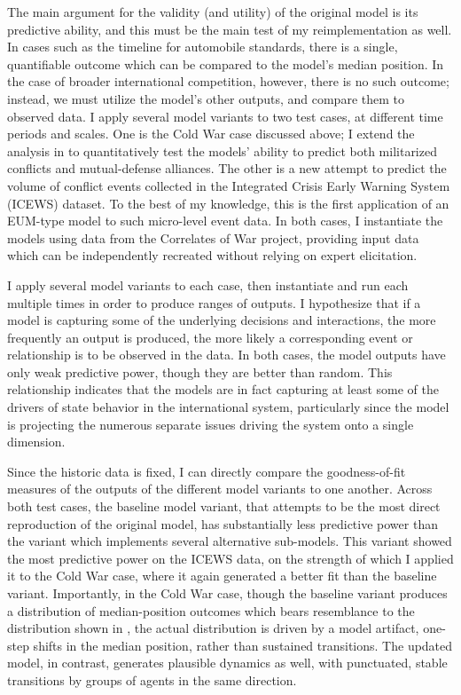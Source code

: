 The main argument for the validity (and utility) of the original model is its predictive ability, and this must be the main test of my reimplementation as well. In cases such as the timeline for automobile standards, there is a single, quantifiable outcome which can be compared to the model's median position. In the case of broader international competition, however, there is no such outcome; instead, we must utilize the model's other outputs, and compare them to observed data. I apply several model variants to two test cases, at different time periods and scales. One is the Cold War case discussed above; I extend the analysis in \citet{bdm_1998} to quantitatively test the models' ability to predict both militarized conflicts and mutual-defense alliances. The other is a new attempt to predict the volume of conflict events collected in the Integrated Crisis Early Warning System (ICEWS) dataset. To the best of my knowledge, this is the first application of an EUM-type model to such micro-level event data. In both cases, I instantiate the models using data from the Correlates of War project, providing input data which can be independently recreated without relying on expert elicitation.

I apply several model variants to each case, then instantiate and run each multiple times in order to produce ranges of outputs. I hypothesize that if a model is capturing some of the underlying decisions and interactions, the more frequently an output is produced, the more likely a corresponding event or relationship is to be observed in the data.  In both cases, the model outputs have only weak predictive power, though they are better than random. This relationship indicates that the models are in fact capturing at least some of the drivers of state behavior in the international system, particularly since the model is projecting the numerous separate issues driving the system onto a single dimension.

Since the historic data is fixed, I can directly compare the goodness-of-fit measures of the outputs of the different model variants to one another. Across both test cases, the baseline model variant, that attempts to be the most direct reproduction of the original model, has substantially less predictive power than the variant which implements several alternative sub-models. This variant showed the most predictive power on the ICEWS data, on the strength of which I applied it to the Cold War case, where it again generated a better fit than the baseline variant. Importantly, in the Cold War case, though the baseline variant produces a distribution of median-position outcomes which bears resemblance to the distribution shown in \citet{bdm_1998}, the actual distribution is driven by a model artifact, one-step shifts in the median position, rather than sustained transitions. The updated model, in contrast, generates plausible dynamics as well, with punctuated, stable transitions by groups of agents in the same direction.

